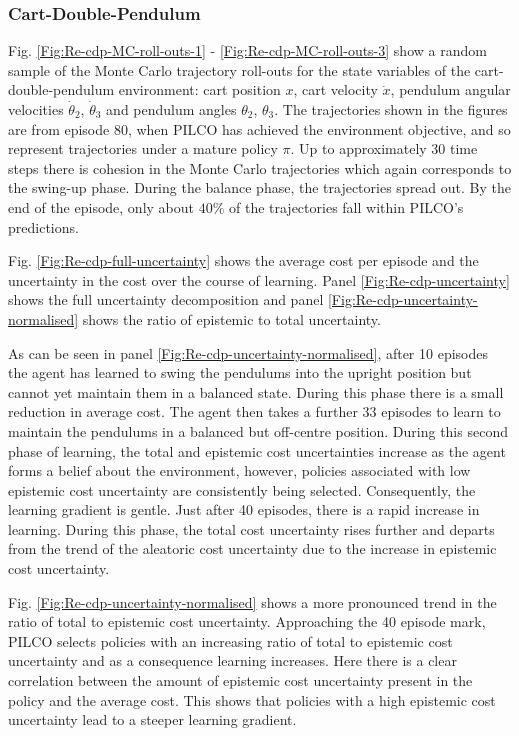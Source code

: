 \subsubsection{Cart-Double-Pendulum}
Fig. \ref{Fig:Re-cdp-MC-roll-outs-1} - \ref{Fig:Re-cdp-MC-roll-outs-3} show a random sample of the Monte Carlo trajectory roll-outs for the state variables of the cart-double-pendulum environment: cart position $x$, cart velocity $\dot x$, pendulum angular velocities $\dot{\theta}_{2}$, $\dot{\theta}_{3}$ and pendulum angles $\theta_{2}$, $\theta_{3}$. The trajectories shown in the figures are from episode 80, when PILCO has achieved the environment objective, and so represent trajectories under a mature policy $\pi$. Up to approximately 30 time steps there is cohesion in the Monte Carlo trajectories which again corresponds to the swing-up phase. During the balance phase, the trajectories spread out. By the end of the episode, only about $40\%$ of the trajectories fall within PILCO's predictions. 

Fig. \ref{Fig:Re-cdp-full-uncertainty} shows the average cost per episode and the uncertainty in the cost over the course of learning. Panel \ref{Fig:Re-cdp-uncertainty} shows the full uncertainty decomposition and panel \ref{Fig:Re-cdp-uncertainty-normalised} shows the ratio of epistemic to total uncertainty.

As can be seen in panel \ref{Fig:Re-cdp-uncertainty-normalised}, after 10 episodes the agent has learned to swing the pendulums into the upright position but cannot yet maintain them in a balanced state. During this phase there is a small reduction in average cost. The agent then takes a further 33 episodes to learn to maintain the pendulums in a balanced but off-centre position. During this second phase of learning, the total and epistemic cost uncertainties increase as the agent forms a belief about the environment, however, policies associated with low epistemic cost uncertainty are consistently being selected. Consequently, the learning gradient is gentle. Just after 40 episodes, there is a rapid increase in learning. During this phase, the total cost uncertainty rises further and departs from the trend  of the aleatoric cost uncertainty due to the increase in epistemic cost uncertainty. 

Fig. \ref{Fig:Re-cdp-uncertainty-normalised} shows a more pronounced trend in the ratio of total to epistemic cost uncertainty. Approaching the 40 episode mark, PILCO selects policies with an increasing ratio of total to epistemic cost uncertainty and as a consequence learning increases. Here there is a clear correlation between the amount of epistemic cost uncertainty present in the policy and the average cost. This shows that policies with a high epistemic cost uncertainty lead to a steeper learning gradient. 

